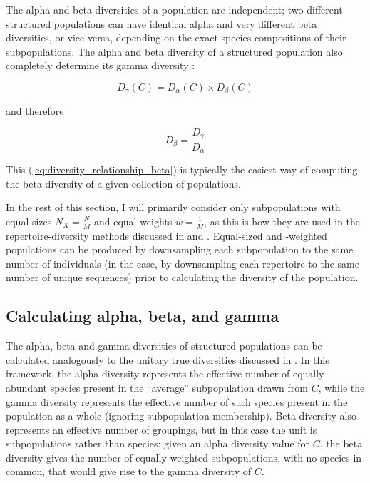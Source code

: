 \noindent The alpha and beta diversities of a population are independent; two different structured populations can have identical alpha and very different beta diversities, or vice versa, depending on the exact species compositions of their subpopulations. The alpha and beta diversity of a structured population also completely determine its gamma diversity \citep{jost2007partitioning}:

\begin{equation}
D_\gamma(C) = D_\alpha(C) \times D_\beta(C)
\label{eq:diversity_relationship_gamma}
\end{equation}

\noindent and therefore 

\begin{equation}
D_\beta = \frac{D_\gamma}{D_\alpha}
\label{eq:diversity_relationship_beta}
\end{equation}

\noindent This (\autoref{eq:diversity_relationship_beta}) is typically the easiest way of computing the beta diversity of a given collection of populations.

In the rest of this section, I will primarily consider only subpopulations with equal sizes $N_X = \frac{N}{M}$ and equal weights $w = \frac{1}{M}$, as this is how they are used in the repertoire-diversity methods discussed in  and . Equal-sized and -weighted populations can be produced by downsampling each subpopulation to the same number of individuals (in the \igseq case, by downsampling each repertoire to the same number of unique sequences) prior to calculating the diversity of the population.
 
\subsection{Calculating alpha, beta, and gamma}
\label{app:diversity-structured-calc}

The alpha, beta and gamma diversities of structured populations can be calculated analogously to the unitary true diversities discussed in . In this framework, the alpha diversity represents the effective number of equally-abundant species present in the ``average'' subpopulation drawn from $C$, while the gamma diversity represents the effective number of such species present in the population as a whole (ignoring subpopulation membership). Beta diversity also represents an effective number of groupings, but in this case the unit is subpopulations rather than species: given an alpha diversity value for $C$, the beta diversity gives the number of equally-weighted subpopulations, with no species in common, that would give rise to the gamma diversity of $C$.

